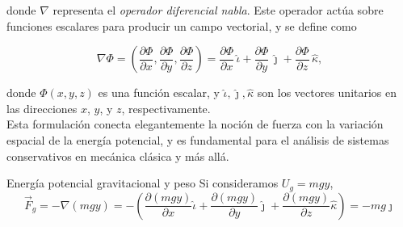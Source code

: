 donde $\nabla$ representa el \textit{operador diferencial nabla}. Este operador actúa sobre funciones escalares para producir un campo vectorial, y se define como

\begin{equation}
\nabla \Phi = \left( \frac{\partial \Phi}{\partial x}, \frac{\partial \Phi}{\partial y}, \frac{\partial \Phi}{\partial z} \right) = \frac{\partial \Phi}{\partial x}\, \hat{\iota} + \frac{\partial \Phi}{\partial y}\, \hat{\jmath} + \frac{\partial \Phi}{\partial z}\, \hat{\kappa},
\end{equation}

donde $\Phi(x,y,z)$ es una función escalar, y $\hat{\iota}, \hat{\jmath}, \hat{\kappa}$ son los vectores unitarios en las direcciones $x$, $y$, y $z$, respectivamente.\\[.35cm]

Esta formulación conecta elegantemente la noción de fuerza con la variación espacial de la energía potencial, y es fundamental para el análisis de sistemas conservativos en mecánica clásica y más allá.

\begin{wwteorema}{Energ\'ia potencial gravitacional y peso}
    Si consideramos $U_g=mgy$,
    $$\vec{F}_g=-\nabla(mgy)=-\displaystyle \left(\frac{\partial (mgy)}{\partial x}\hat{\iota}+\frac{\partial (mgy)}{\partial y}\hat{\jmath}+\frac{\partial (mgy)}{\partial z}\hat{\kappa} \right)=-mg\hat{\jmath}$$
\end{wwteorema}




